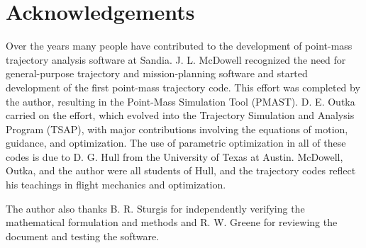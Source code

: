 \chapter*{Acknowledgements}

Over the years many people have contributed to the development of point-mass
trajectory analysis software at Sandia. J. L. McDowell recognized the need for
general-purpose trajectory and mission-planning software and started development of
the first point-mass trajectory code. This effort was completed by the author,
resulting in the Point-Mass Simulation Tool (PMAST). D. E. Outka carried on the
effort, which evolved into the Trajectory Simulation and Analysis Program (TSAP),
with major contributions involving the equations of motion, guidance, and
optimization. The use of parametric optimization in all of these codes is due to
D. G. Hull from the University of Texas at Austin. McDowell, Outka, and the author
were all students of Hull, and the trajectory codes reflect his teachings in flight
mechanics and optimization.

The author also thanks B. R. Sturgis for independently verifying the mathematical
formulation and methods and R. W. Greene for reviewing the document and testing
the software.
